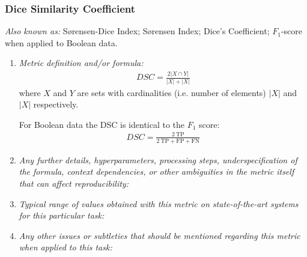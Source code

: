 \documentclass[a4paper,11pt]{article}
\begin{document}
        \subsubsection{Dice Similarity Coefficient}
            \textit{Also known as:} S{\o}rensen-Dice Index; S{\o}rensen Index; Dice's Coefficient; $F_1$-score when applied to Boolean data.
            \begin{enumerate}[label=\alph*.]
                \item \textit{Metric definition and/or formula:}
                    \begin{align}
                        DSC = \frac{2\left| X \cap Y \right|}{\left|X\right| + \left|X\right|}
                    \end{align}
                    where $X$ and $Y$ are sets with cardinalities (i.e. number of elements) $\left|X\right|$ and $\left|X\right|$ respectively.

                    For Boolean data the DSC is identical to the $F_1$ score:
                    \begin{align}
                        DSC = \frac{2\ \textrm{TP}}{2\ \textrm{TP} + \textrm{FP} + \textrm{FN}}
                    \end{align}
                \bigskip
                \item \textit{Any further details, hyperparameters, processing steps, underspecification of the formula, context dependencies, or other ambiguities in the metric itself that can affect reproducibility:}
                \bigskip
                \item \textit{Typical range of values obtained with this metric on state-of-the-art systems for this particular task:}
                \bigskip
                \item \textit{Any other issues or subtleties that should be mentioned regarding this metric when applied to this task:}
                \bigskip
            \end{enumerate}
\end{document}
